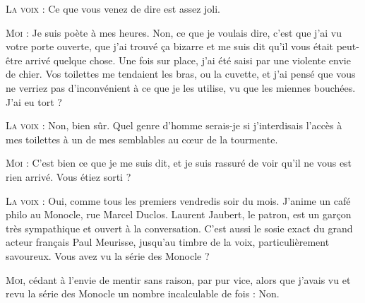 \begin{dialogue}
\textsc{La voix} : Ce que vous venez de dire est assez joli.

\textsc{Moi} : Je suis poète à mes heures. Non, ce que je voulais dire, c’est que j’ai vu votre porte ouverte, que j’ai trouvé ça bizarre et me suis dit qu’il vous était peut-être arrivé quelque chose. Une fois sur place, j’ai été saisi par une violente envie de chier. Vos toilettes me tendaient les bras, ou la cuvette, et j’ai pensé que vous ne verriez pas d’inconvénient à ce que je les utilise, vu que les miennes bouchées. J’ai eu tort ?

\textsc{La voix} : Non, bien sûr. Quel genre d’homme serais-je si j’interdisais l’accès à mes toilettes à un de mes semblables au cœur de la tourmente.

\textsc{Moi} : C’est bien ce que je me suis dit, et je suis rassuré de voir qu’il ne vous est rien arrivé. Vous étiez sorti ?

%
%
%
\textsc{La voix} : Oui, comme tous les premiers vendredis soir du mois. J’anime un café philo au Monocle, rue Marcel Duclos. Laurent Jaubert, le patron, est un garçon très sympathique et ouvert à la conversation. C’est aussi le sosie exact du grand acteur français Paul Meurisse, jusqu’au timbre de la voix, particulièrement savoureux. Vous avez vu la série des Monocle ?

\textsc{Moi}, cédant à l’envie de mentir sans raison, par pur vice, alors que j’avais vu et revu la série des Monocle un nombre incalculable de fois : Non.


\end{dialogue}
